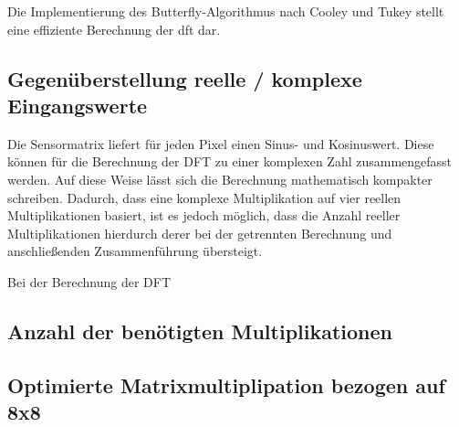   Die Implementierung des Butterfly-Algorithmus nach Cooley und Tukey stellt eine effiziente Berechnung der \gls{dft} dar. 
  
  
  \subsection{Gegenüberstellung reelle / komplexe Eingangswerte}
  Die Sensormatrix liefert für jeden Pixel einen Sinus- und Kosinuswert. Diese können für die Berechnung der DFT zu einer komplexen Zahl zusammengefasst werden. 
  Auf diese Weise lässt sich die Berechnung mathematisch kompakter schreiben. Dadurch, dass eine komplexe Multiplikation auf vier reellen Multiplikationen basiert,
  ist es jedoch möglich, dass die Anzahl reeller Multiplikationen hierdurch derer bei der getrennten Berechnung und anschließenden Zusammenführung übersteigt.
  
  Bei der Berechnung der DFT 
 
  
 \subsection{Anzahl der benötigten Multiplikationen}
 \subsection{Optimierte Matrixmultiplipation bezogen auf 8x8}